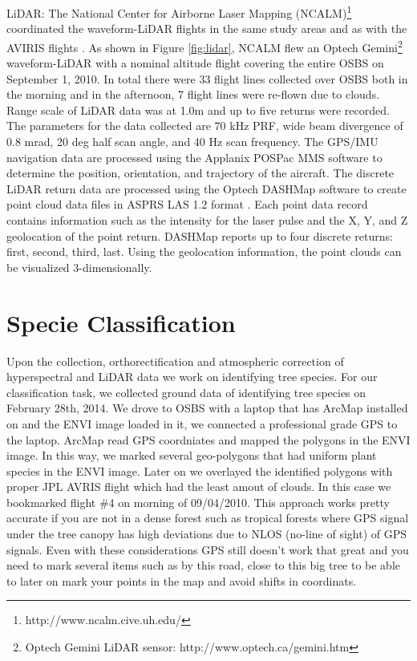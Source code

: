 \documentclass[remotesensing,article,accept,moreauthors,pdftex,12pt,a4paper]{mdpi}
\begin{document}
LiDAR: The National Center for Airborne Laser Mapping (NCALM)\footnote{http://www.ncalm.cive.uh.edu/} coordinated the waveform-LiDAR flights in the same study areas and as  with the AVIRIS flights \cite{neon2010aop}. As shown in Figure \ref{fig:lidar}, NCALM flew an Optech Gemini\footnote{Optech Gemini LiDAR sensor: http://www.optech.ca/gemini.htm} waveform-LiDAR with a nominal altitude flight covering the entire OSBS on September 1, 2010. In total there were 33 flight lines collected over OSBS both in the morning and in the afternoon, 7 flight lines were re-flown due to clouds. Range scale of LiDAR data was at 1.0m and up to five returns were recorded. The parameters for the data collected are 70 kHz PRF, wide beam divergence of 0.8 mrad, 20 deg half scan angle, and 40 Hz scan frequency. The GPS/IMU navigation data are processed using the Applanix POSPac MMS software to determine the position, orientation, and trajectory of the aircraft. The discrete LiDAR return data are processed using the Optech DASHMap software to create point cloud data files in ASPRS LAS 1.2 format \cite{las12format}. Each point data record contains information such as the intensity for the laser pulse and the X, Y, and Z geolocation of the point return. DASHMap reports up to four discrete returns: first, second, third, last. Using the geolocation information, the point clouds can be visualized 3-dimensionally.




\section{Specie Classification}

Upon the collection, orthorectification and atmospheric correction of hyperspectral and LiDAR data we work on identifying tree species. For our classification task, we collected ground data of identifying tree species on February 28th, 2014. We drove to OSBS with a laptop that has ArcMap installed on and the ENVI image loaded in it, we connected a professional grade GPS to the laptop. ArcMap read GPS coordniates and mapped the polygons in the ENVI image. In this way, we marked several geo-polygons that had uniform plant species in the ENVI image. Later on we overlayed the identified polygons with proper JPL AVRIS flight which had the least amout of clouds. In this case we bookmarked flight \#4 on morning of 09/04/2010. This approach works pretty accurate if you are not in a dense forest such as tropical forests where GPS signal under the tree canopy has high deviations due to NLOS (no-line of sight) of GPS signals. Even with these considerations GPS still doesn't work that great and you need to mark several items such as by this road, close to this big tree to be able to later on mark your points in the map and avoid shifts in coordinats.
\end{document}
